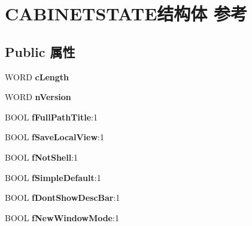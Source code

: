 \hypertarget{struct_c_a_b_i_n_e_t_s_t_a_t_e}{}\section{C\+A\+B\+I\+N\+E\+T\+S\+T\+A\+T\+E结构体 参考}
\label{struct_c_a_b_i_n_e_t_s_t_a_t_e}
\subsection*{Public 属性}
\begin{DoxyCompactItemize}
\item 
\mbox{\label{struct_c_a_b_i_n_e_t_s_t_a_t_e_a09ceae8d67d2a6eec9e53c2a0a1fe18e}} 
W\+O\+RD {\bfseries c\+Length}
\item 
\mbox{\label{struct_c_a_b_i_n_e_t_s_t_a_t_e_a36dc431a8087e0317801d9a5cebd2acd}} 
W\+O\+RD {\bfseries n\+Version}
\item 
\mbox{\label{struct_c_a_b_i_n_e_t_s_t_a_t_e_ab51cfa3d11bbb008060886b8cdde2b8d}} 
B\+O\+OL {\bfseries f\+Full\+Path\+Title}\+:1
\item 
\mbox{\label{struct_c_a_b_i_n_e_t_s_t_a_t_e_a842c34f7fdb0a7bc5f471e3478755cd6}} 
B\+O\+OL {\bfseries f\+Save\+Local\+View}\+:1
\item 
\mbox{\label{struct_c_a_b_i_n_e_t_s_t_a_t_e_a68703ead25b9cbf93c5a38dc43680947}} 
B\+O\+OL {\bfseries f\+Not\+Shell}\+:1
\item 
\mbox{\label{struct_c_a_b_i_n_e_t_s_t_a_t_e_a183c25e6003375596585f0fa37aeca0c}} 
B\+O\+OL {\bfseries f\+Simple\+Default}\+:1
\item 
\mbox{\label{struct_c_a_b_i_n_e_t_s_t_a_t_e_a4434766c398ef47afbe11a32c36b79bf}} 
B\+O\+OL {\bfseries f\+Dont\+Show\+Desc\+Bar}\+:1
\item 
\mbox{\label{struct_c_a_b_i_n_e_t_s_t_a_t_e_a74be76f1d270a1699c516b308a88034d}} 
B\+O\+OL {\bfseries f\+New\+Window\+Mode}\+:1

\end{DoxyCompactItemize}
